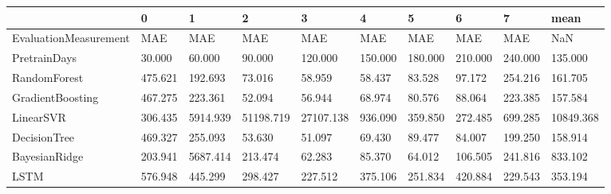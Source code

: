 \begin{tabular}{llllllllll}
\toprule
{} &       0 &        1 &         2 &         3 &       4 &       5 &       6 &       7 &      mean \\
\midrule
EvaluationMeasurement &     MAE &      MAE &       MAE &       MAE &     MAE &     MAE &     MAE &     MAE &       NaN \\
PretrainDays          &  30.000 &   60.000 &    90.000 &   120.000 & 150.000 & 180.000 & 210.000 & 240.000 &   135.000 \\
RandomForest          & 475.621 &  192.693 &    73.016 &    58.959 &  58.437 &  83.528 &  97.172 & 254.216 &   161.705 \\
GradientBoosting      & 467.275 &  223.361 &    52.094 &    56.944 &  68.974 &  80.576 &  88.064 & 223.385 &   157.584 \\
LinearSVR             & 306.435 & 5914.939 & 51198.719 & 27107.138 & 936.090 & 359.850 & 272.485 & 699.285 & 10849.368 \\
DecisionTree          & 469.327 &  255.093 &    53.630 &    51.097 &  69.430 &  89.477 &  84.007 & 199.250 &   158.914 \\
BayesianRidge         & 203.941 & 5687.414 &   213.474 &    62.283 &  85.370 &  64.012 & 106.505 & 241.816 &   833.102 \\
LSTM                  & 576.948 &  445.299 &   298.427 &   227.512 & 375.106 & 251.834 & 420.884 & 229.543 &   353.194 \\
\bottomrule
\end{tabular}
